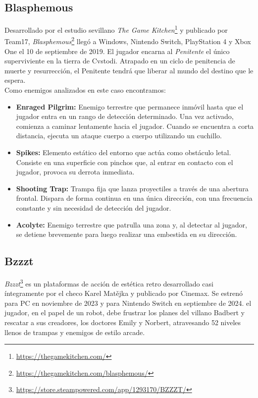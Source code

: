 \subsection{Blasphemous}
Desarrollado por el estudio sevillano \emph{The Game Kitchen}\footnote{\url{https://thegamekitchen.com/}} y publicado por Team17, \textit{Blasphemous}\footnote{\url{https://thegamekitchen.com/blasphemous/}} llegó a Windows, Nintendo Switch, PlayStation 4 y Xbox One el 10 de septiembre de 2019. El jugador encarna al \textit{Penitente} el único superviviente en la tierra de Cvstodi. Atrapado en un ciclo de penitencia de muerte y resurrección, el Penitente tendrá que liberar al mundo del destino que le espera.\\

Como enemigos analizados en este caso encontramos:
\begin{itemize}
	\item \textbf{Enraged Pilgrim:} Enemigo terrestre que permanece inmóvil hasta que el jugador entra en un rango de detección determinado. Una vez activado, comienza a caminar lentamente hacia el jugador. Cuando se encuentra a corta distancia, ejecuta un ataque cuerpo a cuerpo utilizando un cuchillo.
	\item \textbf{Spikes:} Elemento estático del entorno que actúa como obstáculo letal. Consiste en una superficie con pinchos que, al entrar en contacto con el jugador, provoca su derrota inmediata. 
	\item \textbf{Shooting Trap:} Trampa fija que lanza proyectiles a través de una abertura frontal. Dispara de forma continua en una única dirección, con una frecuencia constante y sin necesidad de detección del jugador.
	\item \textbf{Acolyte:} Enemigo terrestre que patrulla una zona y, al detectar al jugador, se detiene brevemente para luego realizar una embestida en su dirección.
\end{itemize}


\subsection{Bzzzt}

\textit{Bzzzt}\footnote{\url{https://store.steampowered.com/app/1293170/BZZZT/}} es un plataformas de acción de estética retro desarrollado casi íntegramente por el checo Karel Matějka  y publicado por Cinemax. Se estrenó para PC en noviembre de 2023 y para Nintendo Switch en septiembre de 2024. el jugador, en el papel de un robot, debe frustrar los planes del villano Badbert y rescatar a sus creadores, los doctores Emily y Norbert, atravesando 52 niveles llenos de trampas y enemigos de estilo arcade.

